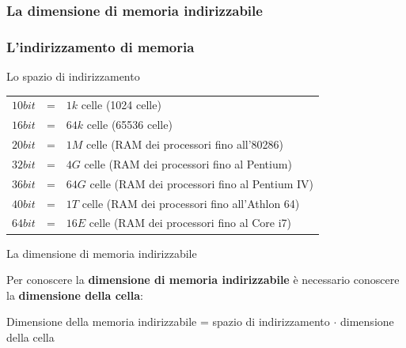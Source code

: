 \subsubsection[La dimensione di memoria indirizzabile]{La dimensione di memoria indirizzabile}
\begin{frame}
	\frametitle{L'indirizzamento di memoria}
	
	\begin{block}{Lo spazio di indirizzamento}
		\begin{table}[]
			\centering
			\begin{tabular}{lcl}
			$10bit$ & = & $1k$ celle (1024 celle) \\
			$16bit$ & = & $64k$ celle (65536 celle) \\
			$20bit$ & = & $1M$ celle (RAM dei processori fino all'80286) \\
			$32bit$ & = & $4G$ celle (RAM dei processori fino al Pentium) \\
			$36bit$ & = & $64G$ celle (RAM dei processori fino al Pentium IV)  \\
			$40bit$ & = & $1T$ celle (RAM dei processori fino all’Athlon 64)  \\
			$64bit$ & = & $16E$ celle (RAM dei processori fino al Core i7)  \\
			
			\end{tabular}
		\end{table}		
	\end{block}
	
	\begin{block}{La dimensione di memoria indirizzabile}
	
		Per conoscere la \textbf{dimensione di memoria indirizzabile} è necessario conoscere la \textbf{dimensione della cella}:\\
		
		\begin{scriptsize}
			Dimensione della memoria indirizzabile = spazio di indirizzamento $\cdot$ dimensione della cella
		\end{scriptsize}
		
	\end{block}
\end{frame}


